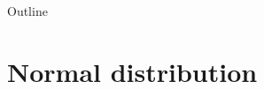 \documentclass[slidestop,compress,mathserif]{beamer}
\begin{document}
%


%
%
%
%
%
%
%
%



\begin{frame}{Outline}
\tableofcontents[hideallsubsections]
\end{frame}

\section{Normal distribution}
\end{document}
